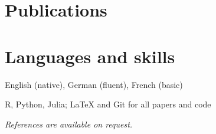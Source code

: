 \documentclass[11pt,a4paper]{article}
\begin{document}
\section{Publications}
\nocite{*}

\section{Languages and skills}
\begin{cvlist}
  \item[Languages] English (native), German (fluent), French (basic)
  \item[Software] R, Python, Julia; \LaTeX{} and Git for all papers and code
\end{cvlist}

\vspace{1em}
\textit{References are available on request.}
\end{document}
